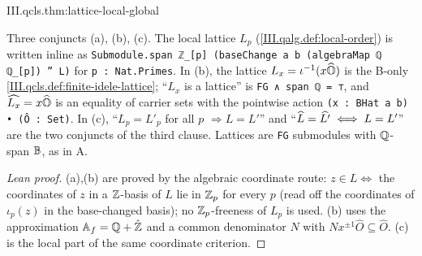 \begin{theorem}
\end{theorem}
\begin{tfformal}{III.qcls.thm:lattice-local-global}
\begin{tffidelity}
Three conjuncts (a), (b), (c). The local lattice $L_p$ (\cref{III.qalg.def:local-order}) is written inline as \texttt{Submodule.span ℤ\_[p] (baseChange a b (algebraMap ℚ ℚ\_[p]) '' L)} for \texttt{p : Nat.Primes}. In (b), the lattice $L_x=\iota^{-1}(x\widehat{\mathbb{O}})$ is the B-only \cref{III.qcls.def:finite-idele-lattice}; ``$L_x$ is a lattice'' is \texttt{FG ∧ span ℚ = ⊤}, and $\widehat{L_x}=x\widehat{\mathbb{O}}$ is an equality of carrier sets with the pointwise action \texttt{(x : BHat a b) • (Ô : Set)}. In (c), ``$L_p=L'_p$ for all $p$ $\Rightarrow L=L'$'' and ``$\widehat{L}=\widehat{L'}\iff L=L'$'' are the two conjuncts of the third clause. Lattices are \texttt{FG} submodules with $\mathbb{Q}$-span $\mathbb{B}$, as in A.
\end{tffidelity}
\end{tfformal}
\begin{proof}[Lean proof]
(a),(b) are proved by the algebraic coordinate route: $z\in L\iff$ the coordinates of $z$ in a $\mathbb{Z}$-basis of $L$ lie in $\mathbb{Z}_p$ for every $p$ (read off the coordinates of $\iota_p(z)$ in the base-changed basis); no $\mathbb{Z}_p$-freeness of $L_p$ is used. (b) uses the approximation $\mathbb{A}_f=\mathbb{Q}+\hat{\mathbb{Z}}$ and a common denominator $N$ with $Nx^{\pm1}\hat O\subseteq\hat O$. (c) is the local part of the same coordinate criterion.
\end{proof}

